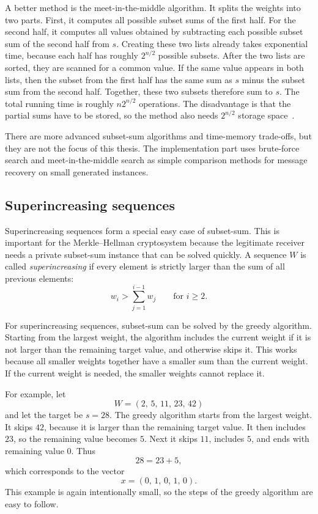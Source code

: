 A better method is the meet-in-the-middle algorithm. It splits the weights into
two parts. First, it computes all possible subset sums of the first half. For
the second half, it computes all values obtained by subtracting each possible
subset sum of the second half from $s$. Creating these two lists already takes
exponential time, because each half has roughly $2^{n/2}$ possible subsets.
After the two lists are sorted, they are scanned for a common value. If the
same value appears in both lists, then the subset from the first half has the
same sum as $s$ minus the subset sum from the second half. Together, these two
subsets therefore sum to $s$. The total running time is roughly $n2^{n/2}$
operations. The disadvantage is that the partial sums have to be stored, so the
method also needs $2^{n/2}$ storage space~\cite[pp.~75--76]{OdlyzkoRiseFall}.

There are more advanced subset-sum algorithms and time-memory trade-offs, but
they are not the focus of this thesis. The implementation part uses brute-force
search and meet-in-the-middle search as simple comparison methods for message
recovery on small generated instances.

\subsection*{Superincreasing sequences}

Superincreasing sequences form a special easy case of subset-sum. This is
important for the Merkle--Hellman cryptosystem because the legitimate receiver
needs a private subset-sum instance that can be solved quickly. A sequence $W$
is called \emph{superincreasing} if every element is strictly larger than the
sum of all previous elements:
\[
    w_i > \sum_{j=1}^{i-1} w_j \qquad \text{for } i \ge 2.
\]

For superincreasing sequences, subset-sum can be solved by the greedy
algorithm. Starting from the largest weight, the algorithm includes the current
weight if it is not larger than the remaining target value, and otherwise skips
it. This works because all smaller weights together have a smaller sum than the
current weight. If the current weight is needed, the smaller weights cannot
replace it.

For example, let
\[
    W=(2,\,5,\,11,\,23,\,42)
\]
and let the target be $s=28$. The greedy algorithm starts from the largest
weight. It skips $42$, because it is larger than the remaining target value.
It then includes $23$, so the remaining value becomes $5$. Next it skips $11$,
includes $5$, and ends with remaining value $0$. Thus
\[
    28 = 23 + 5,
\]
which corresponds to the vector
\[
    x=(0,\,1,\,0,\,1,\,0).
\]
This example is again intentionally small, so the steps of the greedy algorithm
are easy to follow.

